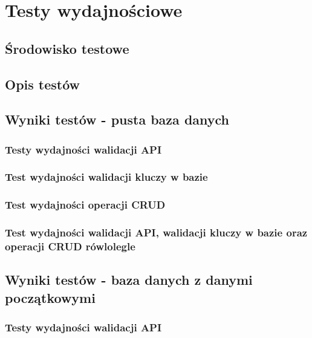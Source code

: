 \chapter{Testy wydajnościowe}
\section{Środowisko testowe}
\section{Opis testów}
\section{Wyniki testów - pusta baza danych}

\subsection{Testy wydajności walidacji API}


\subsection{Test wydajności walidacji kluczy w bazie}


\subsection{Test wydajności operacji CRUD}


\subsection{Test wydajności walidacji API, walidacji kluczy w bazie oraz operacji CRUD rówlolegle }


\section{Wyniki testów - baza danych z danymi początkowymi}
\subsection{Testy wydajności walidacji API}
 

